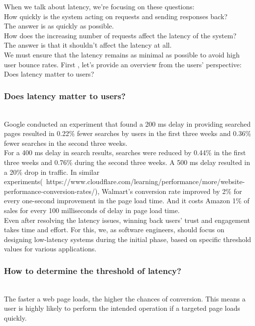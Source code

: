When we talk about latency, we're focusing on these questions:
\\
How quickly is the system acting on requests and sending responses back?\\
The answer is as quickly as possible.
\\
How does the increasing number of requests affect the latency of the system?
\\
The answer is that it shouldn't affect the latency at all.
\\
We must ensure that the latency remains as minimal as possible to avoid high user bounce rates. First , let's provide an overview from the users' perspective: Does latency matter to users?

\subsubsection{Does latency matter to users?}\label{Lr7OBNa2INeuvMiC1HEZX}
\\
Google conducted an experiment that found a 200 ms delay in providing searched pages resulted in 0.22\% fewer searches by users in the first three weeks and 0.36\% fewer searches in the second three weeks.
\\
For a 400 ms delay in search results, searches were reduced by 0.44\% in the first three weeks and 0.76\% during the second three weeks. A 500 ms delay resulted in a 20\% drop in traffic. In similar experiments(~https://www.cloudflare.com/learning/performance/more/website-performance-conversion-rates/), Walmart's conversion rate improved by 2\% for every one-second improvement in the page load time. And it costs Amazon 1\% of sales for every 100 milliseconds of delay in page load time.
\\
Even after resolving the latency issues, winning back users' trust and engagement takes time and effort. For this, we, as software engineers, should focus on designing low-latency systems during the initial phase, based on specific threshold values for various applications.

\subsubsection{How to determine the threshold of latency?}\label{k-CJ0W5xueSUctGgj2MRD}
\\
The faster a web page loads, the higher the chances of conversion. This means a user is highly likely to perform the intended operation if a targeted page loads quickly.

